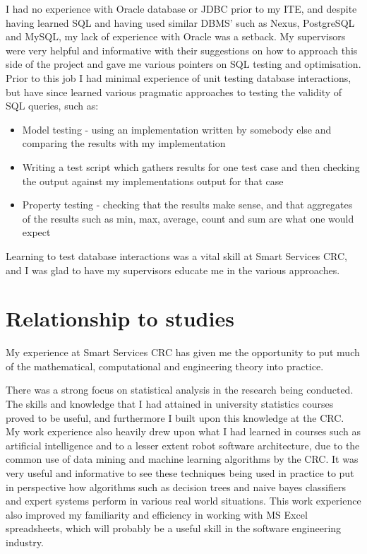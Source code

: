 \documentclass{report}
\begin{document}
I had no experience with Oracle database or JDBC prior to my ITE, and despite having learned SQL and having used similar DBMS' such as Nexus, PostgreSQL and MySQL, my lack of experience with Oracle was a setback. My supervisors were very helpful and informative with their suggestions on how to approach this side of the project and gave me various pointers on SQL testing and optimisation. Prior to this job I had minimal experience of unit testing database interactions, but have since learned various pragmatic approaches to testing the validity of SQL queries, such as:
\begin{itemize}
  \item Model testing - using an implementation written by somebody else and comparing the results with my implementation
  \item Writing a test script which gathers results for one test case and then checking the output against my implementations output for that case
  \item Property testing - checking that the results make sense, and that aggregates of the results such as min, max, average, count and sum are what one would expect
\end{itemize}

Learning to test database interactions was a vital skill at Smart Services CRC, and I was glad to have my supervisors educate me in the various approaches.


\chapter{Relationship to studies}
My experience at Smart Services CRC has given me the opportunity to put much of the mathematical, computational and engineering theory into practice.

There was a strong focus on statistical analysis in the research being conducted. The skills and knowledge that I had attained in university statistics courses proved to be useful, and furthermore I built upon this knowledge at the CRC. My work experience also heavily drew upon what I had learned in courses such as artificial intelligence and to a lesser extent robot software architecture, due to the common use of data mining and machine learning algorithms by the CRC. It was very useful and informative to see these techniques being used in practice to put in perspective how algorithms such as decision trees and naive bayes classifiers and expert systems perform in various real world situations. This work experience also improved my familiarity and efficiency in working with MS Excel spreadsheets, which will probably be a useful skill in the software engineering industry.
\end{document}
